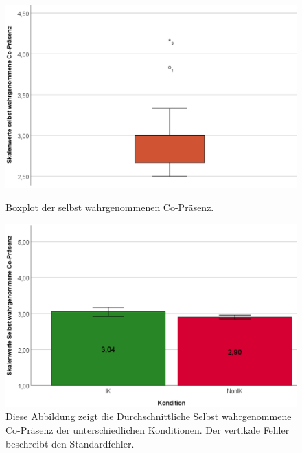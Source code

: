 \documentclass[a4paper,11pt]{article}%
\renewcommand{\\}{\vspace*{0.5\baselineskip} \newline}
\begin{document}
	\begin{figure}[H]
   \begin{minipage}[t]{.5\linewidth} %
      \includegraphics[width=\linewidth]{Abbildungen/AuswertungDiagramme/BP_SelfCoPresence.png}
      \caption[Boxplot der selbst wahrgenommenen Co-Präsenz]{Boxplot der selbst wahrgenommenen Co-Präsenz.}
            \label{SD_SelfCoPresenceBP}
   \end{minipage}
   \hspace{.02\linewidth}%
   \begin{minipage}[t]{.5\linewidth} %
     \includegraphics[width=\linewidth]{Abbildungen/AuswertungDiagramme/SD_SelbstCoPresence_Mittelwerte.png}
      \caption[Durchschnittlich \textit{selbst wahrgenommene Co-Präsenz} der Konditionen]{Diese Abbildung zeigt die Durchschnittliche Selbst wahrgenommene Co-Präsenz der unterschiedlichen Konditionen. Der vertikale Fehler beschreibt den Standardfehler.}
       \label{SD_SelbstCoPresence_Mittelwerte}
   \end{minipage}
\end{figure}
\end{document}
